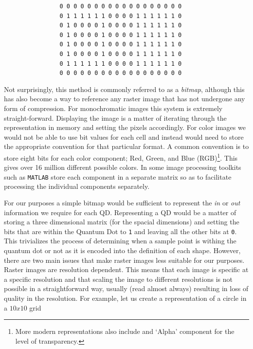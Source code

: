 \documentclass[authoryearcitations]{UoYCSproject}
\begin{document}
\begin{verbatim}
                0 0 0 0 0 0 0 0 0 0 0 0 0 0 0 0 0 0
                0 1 1 1 1 1 1 0 0 0 0 1 1 1 1 1 1 0
                0 1 0 0 0 0 1 0 0 0 0 1 1 1 1 1 1 0
                0 1 0 0 0 0 1 0 0 0 0 1 1 1 1 1 1 0
                0 1 0 0 0 0 1 0 0 0 0 1 1 1 1 1 1 0
                0 1 0 0 0 0 1 0 0 0 0 1 1 1 1 1 1 0
                0 1 1 1 1 1 1 0 0 0 0 1 1 1 1 1 1 0
                0 0 0 0 0 0 0 0 0 0 0 0 0 0 0 0 0 0
\end{verbatim}

Not surprisingly, this method is commonly referred to as a \emph{bitmap}, although this has also become a way to 
reference any raster image that has not undergone any form of compression. 
For monochromatic images this system is extremely straight-forward. Displaying the image is a matter of iterating through
the representation in memory and setting the pixels accordingly. For color images we would not be able to use bit values for
each cell and instead would need to store the appropriate convention for that particular format. A common convention is to store
eight bits for each color component; Red, Green, and Blue (RGB)\footnote{More modern representations also include and `Alpha'
component for the level of transparency.}. This gives over 16 million different possible colors. In some image processing
toolkits such as \verb+MATLAB+ store each component in a separate matrix so as to facilitate processing the individual components
separately. 

For our purposes a simple bitmap would be sufficient to represent the
\emph{in} or \emph{out} information we require for each QD. Representing a QD would be a matter of 
storing a three dimensional matrix (for the spacial dimensions) and setting the bits that are within
the Quantum Dot to \verb+1+ and leaving all the other bits at \verb+0+. This trivializes the process of 
determining when a sample point is withing the quantum dot or not as it is encoded into the definition of 
each shape. However, there are two main
issues that make raster images less suitable for our purposes. Raster images are resolution dependent. This means that
each image is specific at a specific resolution and that scaling the image to different resolutions is not possible in a 
straightforward way, usually (read almost always) resulting in loss of quality in the resolution. For example, let us
create a representation of a circle in a $10x10$ grid
\end{document}
